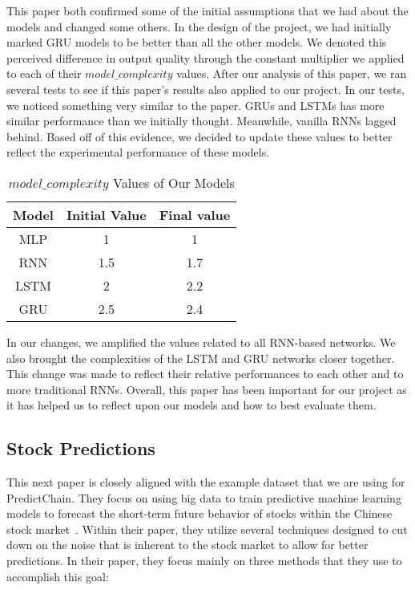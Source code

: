 \documentclass{article}
\begin{document}
    This paper both confirmed some of the initial assumptions that we had about the models and changed some others.
    In the design of the project, we had initially marked GRU models to be better than all the other models.
    We denoted this perceived difference in output quality through the constant multiplier we applied to each of their
    $model\_complexity$ values.  After our analysis of this paper, we ran several tests to see if this paper's results
    also applied to our project.  In our tests, we noticed something very similar to the paper.  GRUs and LSTMs
    has more similar performance than we initially thought.  Meanwhile, vanilla RNNs lagged behind.  Based off of
    this evidence, we decided to update these values to better reflect the experimental performance of these models.

    \begin{table}[h!]
        \begin{center}
            \caption{$model\_complexity$ Values of Our Models}
            \label{tab:modelComplexity}
            \begin{tabular}{c|c|c}
                \textbf{Model} & \textbf{Initial Value} & \textbf{Final value}\\
                \hline
                MLP & 1 & 1\\
                RNN & 1.5 & 1.7\\
                LSTM & 2 & 2.2\\
                GRU & 2.5 & 2.4
            \end{tabular}
        \end{center}
    \end{table}

    In our changes, we amplified the values related to all RNN-based networks.  We also brought the complexities
    of the LSTM and GRU networks closer together.  This change was made to reflect their relative performances to
    each other and to more traditional RNNs.  Overall, this paper has been important for our project as it has
    helped us to reflect upon our models and how to best evaluate them.

    \subsection{Stock Predictions}

    This next paper is closely aligned with the example dataset that we are using for PredictChain.  They focus on
    using big data to train predictive machine learning models to forecast the short-term future behavior of stocks
    within the Chinese stock market~\cite{deepPrediction}.  Within their paper, they utilize several techniques designed
    to cut down on the noise that is inherent to the stock market to allow for better predictions.  In their paper,
    they focus mainly on three methods that they use to accomplish this goal:
\end{document}
